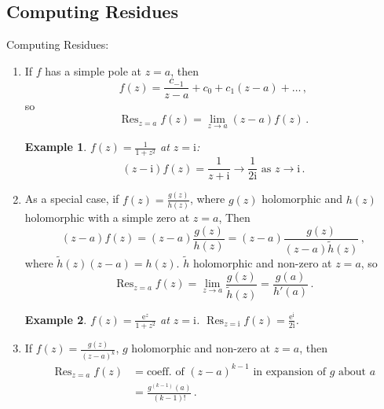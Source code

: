 \documentclass{article}
\theoremstyle{plain}\theoremheaderfont{\normalfont\itshape}\theorembodyfont{\rmfamily}\theoremseparator{.}\newtheorem*{rem}{Remark}\newtheorem*{ex}{Example}\newtheorem*{proof}{Proof}\newtheorem*{altp}{Alternative proof}\newtheorem*{con}{Consequences}\newtheorem*{notn}{Notations}\newtheorem*{cau}{Caution}\newtheorem*{term}{Terminology}\newtheorem*{keyex}{Key example}
\theoremstyle{plain}\theoremheaderfont{\normalfont\bfseries}\theorembodyfont{\rmfamily}\theoremseparator{.}\newtheorem{thm}{Theorem}[section]\newtheorem{lem}[thm]{Lemma}\newtheorem{prop}[thm]{Proposition}\newtheorem*{cor}{Corollary}\newtheorem{defn}[thm]{Definition}\newtheorem{clm}[thm]{Claim}\newtheorem{clminproof}{Claim}\newtheorem{leminproof}{Lemma}\newtheorem{app}{Application}
\theoremstyle{break}\theoremheaderfont{\normalfont\itshape}\theorembodyfont{\rmfamily}\theoremseparator{.\medskip}\newtheorem*{proofskip}{Proof}\newtheorem*{exs}{Examples}\newtheorem*{rems}{Remarks}\newtheorem*{rec}{Recall}\newtheorem*{ppts}{Properties}
\theoremstyle{break}\theoremheaderfont{\normalfont\bfseries}\theorembodyfont{\rmfamily}\theoremseparator{.\medskip}\newtheorem{lemskip}[thm]{Lemma}\newtheorem{defnskip}[thm]{Definition}\newtheorem{propskip}[thm]{Proposition}\newtheorem{thmskip}[thm]{Theorem}
\numberwithin{equation}{section}
\newcommand{\ii}{\mathrm{i}}
\newcommand{\ee}{\mathrm{e}}
\DeclareMathOperator*{\Res}{Res}
\begin{document}
    \subsection{Computing Residues}
    Computing Residues:
    \begin{enumerate}[topsep=0pt,label=(\roman*)]
        \item If \(f\) has a simple pole at \(z=a\), then
        \[f(z)=\frac{c_{-1}}{z-a}+c_0+c_1(z-a)+\dots\,,\]
        so
        \[\Res_{z=a}f(z)=\lim_{z\to a}(z-a)f(z)\,.\]
        \begin{ex}
            \(f(z)=\frac{1}{1+z^2}\) at \(z=\ii\):
            \[(z-\ii)f(z)=\frac{1}{z+\ii}\to\frac{1}{2\ii}\text{ as }z\to \ii\,.\]
        \end{ex}
        \item As a special case, if \(f(z)=\frac{g(z)}{h(z)}\), where \(g(z)\) holomorphic and \(h(z)\) holomorphic with a simple zero at \(z=a\), Then
        \[(z-a)f(z)=(z-a)\frac{g(z)}{h(z)}=(z-a)\frac{g(z)}{(z-a)\tilde{h}(z)}\,,\]
        where \(\tilde{h}(z)(z-a)=h(z)\). \(\tilde{h}\) holomorphic and non-zero at \(z=a\), so
        \[\Res_{z=a}f(z)=\lim_{z\to a}\frac{g(z)}{\tilde{h}(z)}=\frac{g(a)}{h'(a)}\,.\]
        \begin{ex}
            \(f(z)=\frac{\ee^z}{1+z^2}\) at \(z=\ii\). \(\Res_{z=\ii}f(z)=\frac{\ee^\ii}{2\ii}\).
        \end{ex}
        \item If \(f(z)=\frac{g(z)}{(z-a)^k}\), \(g\) holomorphic and non-zero at \(z=a\), then
        \begin{align*}
            \Res_{z=a}f(z)&=\text{coeff. of }(z-a)^{k-1}\text{ in expansion of }g\text{ about }a\\
            &=\frac{g^{(k-1)}(a)}{(k-1)!}\,.
        \end{align*}
    \end{enumerate}
\end{document}
